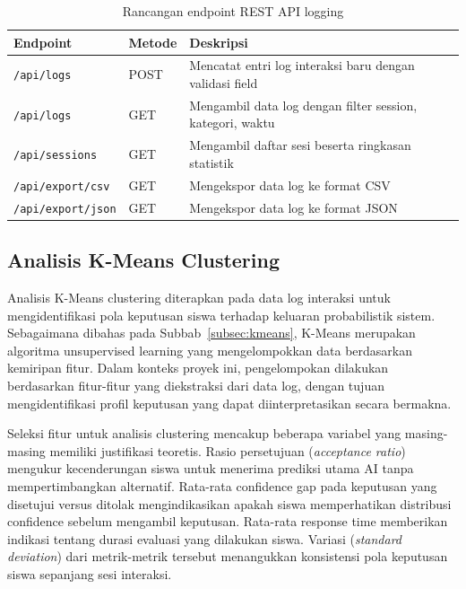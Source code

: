 \documentclass[12pt,oneside]{report}
\begin{document}
\begin{table}[H]
\centering
\caption{Rancangan endpoint REST API logging}
\label{tab:endpoint-api}
\small
\begin{tabularx}{\textwidth}{|l|l|X|}
\hline
\textbf{Endpoint} & \textbf{Metode} & \textbf{Deskripsi} \\
\hline
\texttt{/api/logs} & POST & Mencatat entri log interaksi baru dengan validasi field \\
\hline
\texttt{/api/logs} & GET & Mengambil data log dengan filter session, kategori, waktu \\
\hline
\texttt{/api/sessions} & GET & Mengambil daftar sesi beserta ringkasan statistik \\
\hline
\texttt{/api/export/csv} & GET & Mengekspor data log ke format CSV \\
\hline
\texttt{/api/export/json} & GET & Mengekspor data log ke format JSON \\
\hline
\end{tabularx}
\end{table}

\subsection{Analisis K-Means Clustering}
\label{subsec:analisis-kmeans}

Analisis K-Means clustering diterapkan pada data log interaksi untuk mengidentifikasi pola keputusan siswa terhadap keluaran probabilistik sistem. Sebagaimana dibahas pada Subbab~\ref{subsec:kmeans}, K-Means merupakan algoritma unsupervised learning yang mengelompokkan data berdasarkan kemiripan fitur. Dalam konteks proyek ini, pengelompokan dilakukan berdasarkan fitur-fitur yang diekstraksi dari data log, dengan tujuan mengidentifikasi profil keputusan yang dapat diinterpretasikan secara bermakna.

Seleksi fitur untuk analisis clustering mencakup beberapa variabel yang masing-masing memiliki justifikasi teoretis. Rasio persetujuan (\textit{acceptance ratio}) mengukur kecenderungan siswa untuk menerima prediksi utama AI tanpa mempertimbangkan alternatif. Rata-rata confidence gap pada keputusan yang disetujui versus ditolak mengindikasikan apakah siswa memperhatikan distribusi confidence sebelum mengambil keputusan. Rata-rata response time memberikan indikasi tentang durasi evaluasi yang dilakukan siswa. Variasi (\textit{standard deviation}) dari metrik-metrik tersebut menangukkan konsistensi pola keputusan siswa sepanjang sesi interaksi.
\end{document}
